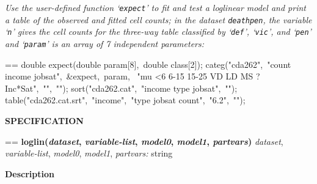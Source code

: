 \documentclass{book}
\makeatletter
\newcommand\Texinfocommandstyletextvar[1]{{\normalfont{}\textsl{#1}}}%
\newenvironment{Texinfopreformatted}{%
  \par\GNUTobeylines\obeyspaces\frenchspacing\parskip=\z@\parindent=\z@}{}
{\catcode`\^^M=13 \gdef\GNUTobeylines{\catcode`\^^M=13 \def^^M{\null\par}}}
\newenvironment{Texinfoindented}{\begin{list}{}{}\item\relax}{\end{list}}
\renewcommand{\_}{\Texinfounderscore\discretionary{}{}{}}
\makeatother
\begin{document}
\emph{Use the user-defined function `\texttt{expect}' to fit and
test a loglinear model and print a table of the
observed and fitted cell counts; in the dataset \texttt{deathpen}, the
variable `\texttt{n}' gives the cell counts for the three-way
table classified by `\texttt{def}', `\texttt{vic}', and `\texttt{pen}' and
`\texttt{param}' is an array of 7 independent parameters:}
\begin{Texinfoindented}
\begin{Texinfopreformatted}%
\ttfamily double expect(double param[8],\ double class[2]);
categ("cda262",\ "count income jobsat",\ \&expect,\ param,
\      "mu <6 6-15 15-25 VD LD MS ?Inc*Sat",\ "",\ "");
sort("cda262.cat",\ "income \_type\_ jobsat",\ "");
table("cda262.cat.srt",\ "income",\ "\_type\_ jobsat count",\ "6.2",\ "");

\end{Texinfopreformatted}
\end{Texinfoindented}

\noindent{}\textbf{SPECIFICATION}
\begin{Texinfoindented}
\begin{Texinfopreformatted}%
\textbf{loglin(\Texinfocommandstyletextvar{dataset}, \Texinfocommandstyletextvar{variable-list}, \Texinfocommandstyletextvar{model0}, \Texinfocommandstyletextvar{model1}, \Texinfocommandstyletextvar{partvars})}
\Texinfocommandstyletextvar{dataset}, \Texinfocommandstyletextvar{variable-list}, \Texinfocommandstyletextvar{model0}, \Texinfocommandstyletextvar{model1}, \Texinfocommandstyletextvar{partvars:} string
\end{Texinfopreformatted}
\end{Texinfoindented}
%
%
%
%

\noindent{}\textbf{Description}
\end{document}
